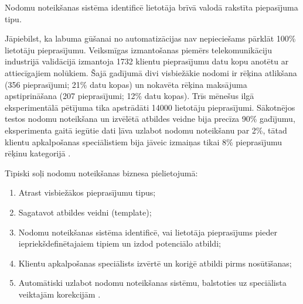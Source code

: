 
Nodomu noteikšanas sistēma identificē lietotāja brīvā valodā rakstīta piepasījuma tipu.

Jāpiebilst, ka labuma gūšanai no automatizācijas nav nepieciešams pārklāt 100\% lietotāju pieprasījumu. Veiksmīgas izmantošanas piemērs telekomunikāciju industrijā validācijā izmantoja 1732 klientu pieprasījumu datu kopu anotētu ar attiecīgajiem nolūkiem. Šajā gadījumā divi visbiežākie nodomi ir rēķina atlikšana (356 pieprasījumi; 21\% datu kopas) un nokavēta rēķina maksājuma apstiprināšana (207 pieprasījumi; 12\% datu kopas). Trīs mēnešus ilgā eksperimentālā pētījuma tika apstrādāti 14000 lietotāju pieprasījumi. Sākotnējos testos nodomu noteikšana un izvēlētā atbildes veidne bija precīza 90\% gadījumu, eksperimenta gaitā iegūtie dati ļāva uzlabot nodomu noteikšanu par 2\%, tātad klientu apkalpošanas speciālistiem bija jāveic izmaiņas tikai 8\% pieprasījumu rēķinu kategorijā \cite{paikens2020}.

Tipiski soļi nodomu noteikšanas biznesa pielietojumā:
\begin{enumerate}
	\item Atrast visbiežākos pieprasījumu tipus;
	\item Sagatavot atbildes veidni (template);
	\item Nodomu noteikšanas sistēma identificē, vai lietotāja pieprasījums pieder iepriekšdefinētajaiem tipiem un izdod potenciālo atbildi;
	\item Klientu apkalpošanas speciālists izvērtē un koriģē atbildi pirms nosūtīšanas;
	\item Automātiski uzlabot nodomu noteikšanas sistēmu, balstoties uz speciālista veiktajām korekcijām \cite{paikens2020}.
\end{enumerate}
